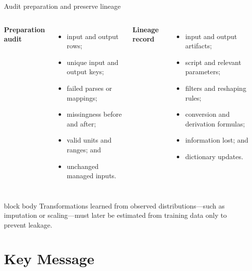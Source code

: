 \documentclass[10pt,aspectratio=169]{beamer}
\begin{document}
\begin{frame}{Audit preparation and preserve lineage}

\small

\begin{columns}[T]


\textbf{Preparation audit}

\begin{itemize}
  \item input and output rows;
  \item unique input and output keys;
  \item failed parses or mappings;
  \item missingness before and after;
  \item valid units and ranges; and
  \item unchanged managed inputs.
\end{itemize}


\textbf{Lineage record}

\begin{itemize}
  \item input and output artifacts;
  \item script and relevant parameters;
  \item filters and reshaping rules;
  \item conversion and derivation formulas;
  \item information lost; and
  \item dictionary updates.
\end{itemize}

\end{columns}

\vspace{0.35cm}

\begin{beamercolorbox}[rounded=true,sep=8pt]{block body}
Transformations learned from observed distributions---such as imputation or scaling---must later be estimated from training data only to prevent leakage.
\end{beamercolorbox}

\end{frame}


\section{Key Message}
\end{document}
